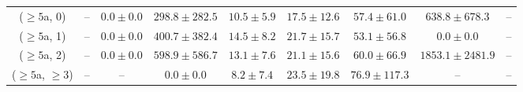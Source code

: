 \begin{table}[h!]
{\begin{tabular}{ccccccccc}
	($\ge5$a, 0) & -- & $0.0\pm 0.0$ & $298.8\pm 282.5$ & $10.5\pm 5.9$ & $17.5\pm 12.6$ & $57.4\pm 61.0$ & $638.8\pm 678.3$ & -- \\[0.5ex] 
	($\ge5$a, 1) & -- & $0.0\pm 0.0$ & $400.7\pm 382.4$ & $14.5\pm 8.2$ & $21.7\pm 15.7$ & $53.1\pm 56.8$ & $0.0\pm 0.0$ & -- \\[0.5ex] 
	($\ge5$a, 2) & -- & $0.0\pm 0.0$ & $598.9\pm 586.7$ & $13.1\pm 7.6$ & $21.1\pm 15.6$ & $60.0\pm 66.9$ & $1853.1\pm 2481.9$ & -- \\[0.5ex] 
	($\ge5$a, $\ge3$) & -- & -- & $0.0\pm 0.0$ & $8.2\pm 7.4$ & $23.5\pm 19.8$ & $76.9\pm 117.3$ & -- & -- \\[0.5ex] 
	\hline
	\hline
\end{tabular}}
\end{table}
